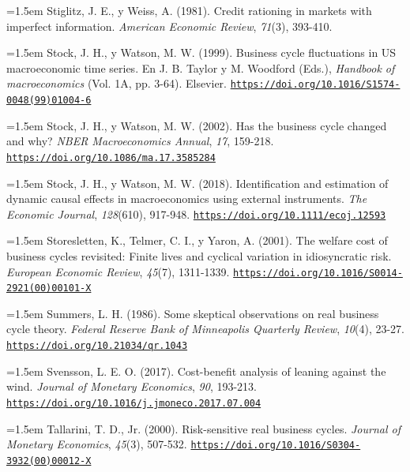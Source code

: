 \documentclass[10pt,a4paper]{article}
\begin{document}
\noindent\hangindent=1.5em Stiglitz, J. E., y Weiss, A. (1981). Credit rationing in markets with imperfect information. \textit{American Economic Review}, \textit{71}(3), 393-410.

{\sloppy\noindent\hangindent=1.5em Stock, J. H., y Watson, M. W. (1999). Business cycle fluctuations in US macroeconomic time series. En J. B. Taylor y M. Woodford (Eds.), \textit{Handbook of macroeconomics} (Vol. 1A, pp. 3-64). Elsevier. \href{https://doi.org/10.1016/S1574-0048(99)01004-6}{\nolinkurl{https://doi.org/10.1016/S1574-0048(99)01004-6}}\par}

\noindent\hangindent=1.5em Stock, J. H., y Watson, M. W. (2002). Has the business cycle changed and why? \textit{NBER Macroeconomics Annual}, \textit{17}, 159-218. \href{https://doi.org/10.1086/ma.17.3585284}{\nolinkurl{https://doi.org/10.1086/ma.17.3585284}}

\noindent\hangindent=1.5em Stock, J. H., y Watson, M. W. (2018). Identification and estimation of dynamic causal effects in macroeconomics using external instruments. \textit{The Economic Journal}, \textit{128}(610), 917-948. \href{https://doi.org/10.1111/ecoj.12593}{\nolinkurl{https://doi.org/10.1111/ecoj.12593}}

{\sloppy\noindent\hangindent=1.5em Storesletten, K., Telmer, C. I., y Yaron, A. (2001). The welfare cost of business cycles revisited: Finite lives and cyclical variation in idiosyncratic risk. \textit{European Economic Review}, \textit{45}(7), 1311-1339. \href{https://doi.org/10.1016/S0014-2921(00)00101-X}{\nolinkurl{https://doi.org/10.1016/S0014-2921(00)00101-X}}\par}

\noindent\hangindent=1.5em Summers, L. H. (1986). Some skeptical observations on real business cycle theory. \textit{Federal Reserve Bank of Minneapolis Quarterly Review}, \textit{10}(4), 23-27. \href{https://doi.org/10.21034/qr.1043}{\nolinkurl{https://doi.org/10.21034/qr.1043}}

\noindent\hangindent=1.5em Svensson, L. E. O. (2017). Cost-benefit analysis of leaning against the wind. \textit{Journal of Monetary Economics}, \textit{90}, 193-213. \href{https://doi.org/10.1016/j.jmoneco.2017.07.004}{\nolinkurl{https://doi.org/10.1016/j.jmoneco.2017.07.004}}

\noindent\hangindent=1.5em Tallarini, T. D., Jr. (2000). Risk-sensitive real business cycles. \textit{Journal of Monetary Economics}, \textit{45}(3), 507-532. \href{https://doi.org/10.1016/S0304-3932(00)00012-X}{\nolinkurl{https://doi.org/10.1016/S0304-3932(00)00012-X}}
\end{document}
